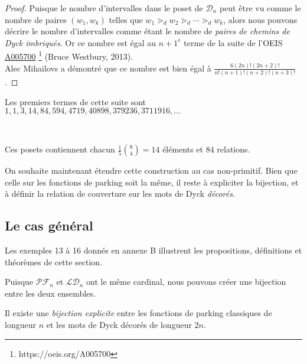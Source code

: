 \begin{proof}
    Puisque le nombre d'intervalles dans le poset de $\mathcal{D}_n$
    peut être vu comme le nombre de paires $(w_1, w_k)$ telles que
    $w_1 \gtrdot_d w_2 \gtrdot_d \cdots \gtrdot_d w_k$, alors nous pouvons
    décrire le nombre d'intervalles comme étant le nombre de 
    \emph{paires de chemins de Dyck imbriqués}.
    Or ce nombre est égal au $n+1^{e}$ terme de la suite de l'OEIS 
    \href{https://oeis.org/A005700}{A005700}
    \footnote{https://oeis.org/A005700} (Bruce Westbury, 2013).\\
Alec Mihailovs a démontré que ce nombre est bien égal à 
$\displaystyle\frac {6 (2n)! (2n+2)!}{n!(n+1)!(n+2)!(n+3)!}$.
\end{proof}

Les premiers termes de cette suite sont $1, 1, 3, 14, 84,
594, 4719, 40898, 379236, 3711916, ...$\\

\newpage
\begin{expl}
    ~\\
    \begin{center}
        
        Ces posets contiennent chacun $\frac {1}{5} \binom{8}{4} =
        14$ éléments et $84$ relations.
    \end{center}
\end{expl}

On souhaite maintenant étendre cette construction au cas non-primitif.
Bien que celle sur les fonctions de parking soit la même, il
reste à expliciter la bijection, et à définir la relation de couverture
sur les mots de Dyck \emph{décorés}.

\subsection{Le cas général}

Les exemples 13 à 16 donnés en annexe B illustrent les propositions,
définitions et théorèmes de cette section.

Puisque $\mathcal{PF}_n$ et $\mathcal{LD}_n$ ont le même cardinal,
nous pouvons créer une bijection entre les deux ensembles.

\begin{prop}
    Il existe une \emph{bijection explicite} entre les fonctions de parking
    classiques de longueur $n$ et les mots de Dyck décorés de
    longueur $2n$.
\end{prop}


